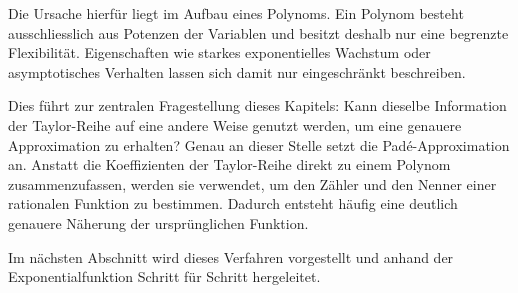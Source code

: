 Die Ursache hierfür liegt im Aufbau eines Polynoms. Ein Polynom besteht ausschliesslich aus Potenzen der Variablen und besitzt deshalb nur eine begrenzte Flexibilität. Eigenschaften wie starkes exponentielles Wachstum oder asymptotisches Verhalten lassen sich damit nur eingeschränkt beschreiben.

Dies führt zur zentralen Fragestellung dieses Kapitels: Kann dieselbe Information der Taylor-Reihe auf eine andere Weise genutzt werden, um eine genauere Approximation zu erhalten? Genau an dieser Stelle setzt die Padé-Approximation an. Anstatt die Koeffizienten der Taylor-Reihe direkt zu einem Polynom zusammenzufassen, werden sie verwendet, um den Zähler und den Nenner einer rationalen Funktion zu bestimmen. Dadurch entsteht häufig eine deutlich genauere Näherung der ursprünglichen Funktion.

Im nächsten Abschnitt wird dieses Verfahren vorgestellt und anhand der Exponentialfunktion Schritt für Schritt hergeleitet.
